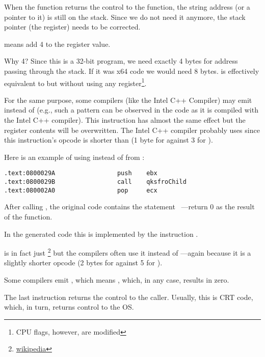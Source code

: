 When the \printf function returns the control to the \main function, the string address (or a pointer to it) is still on the stack.
Since we do not need it anymore, the \gls{stack pointer} (the \ESP register) needs to be corrected.

 means add 4 to the \ESP register value.

Why 4? Since this is a 32-bit program, we need exactly 4 bytes for address passing through the stack. If it was x64 code we would need 8 bytes.
 is effectively equivalent to  but without using any register\footnote{CPU flags, however, are modified}.

\myindex{\oracle}

For the same purpose, some compilers (like the Intel C++ Compiler) may emit  
instead of \ADD (e.g., such a pattern can be observed in the \oracle{} code as it is compiled with the Intel C++ compiler).
This instruction has almost the same effect but the \ECX register contents will be overwritten.
The Intel C++ compiler probably uses  since this instruction's opcode is shorter than  (1 byte for  against 3 for ).

Here is an example of using \POP instead of \ADD from \oracle{}:

\begin{lstlisting}[caption=\oracle 10.2 Linux (app.o file)]
.text:0800029A                 push    ebx
.text:0800029B                 call    qksfroChild
.text:080002A0                 pop     ecx
\end{lstlisting}

After calling \printf, the original \CCpp code contains the statement ~---return 0 as the result of the \main function.

In the generated code this is implemented by the instruction .


\XOR is in fact just \footnote{\href{http://go.yurichev.com/17118}{wikipedia}} but the compilers often use it instead of
---again because it is a slightly shorter opcode (2 bytes for \XOR against 5 for \MOV).

Some compilers emit , which means  \EAX {} \EAX, which, in any case, results in zero.

The last instruction \RET returns the control to the \gls{caller}. Usually, this is \CCpp \ac{CRT} code, which, in turn, returns control to the \ac{OS}.

